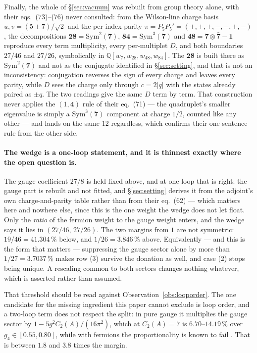 \documentclass[11pt,a4paper]{article}
\newcommand{\rep}[1]{\mathbf{#1}}
\begin{document}
Finally, the whole of \S\ref{sec:vacuum} was rebuilt from group theory alone, with their
eqs.~(73)--(76) never consulted: from the Wilson-line charge basis $u,v=(5\pm7)/\sqrt2$ and the
per-index parity $\pi=P_5P_5'=(+,+,+,-,-,+,-)$, the decompositions $\rep{28}=\mathrm{Sym}^2(\rep7)$,
$\rep{84}=\mathrm{Sym}^3(\rep7)$ and $\rep{48}=\rep7\otimes\rep{\bar7}-\rep1$ reproduce every term
multiplicity, every per-multiplet $D$, and both boundaries $27/46$ and $27/26$, symbolically in
$\mathbb{Q}[w_7,w_{28},w_{48},w_{84}]$. The $\rep{28}$ is built there as $\mathrm{Sym}^2(\rep7)$
and not as the conjugate identified in \S\ref{sec:setting}, and that is not an inconsistency:
conjugation reverses the sign of every charge and leaves every parity, while $D$ sees the charge
only through $c=2|q|$ with the states already paired as $\pm q$. The two readings give the same $D$
term by term. That construction never applies the $(1,\rep4)$ rule of
their eq.~(71) --- the quadruplet's smaller eigenvalue is simply a $\mathrm{Sym}^3(\rep7)$ component
at charge $1/2$, counted like any other --- and lands on the same $12$ regardless, which confirms
their one-sentence rule from the other side.

\paragraph{The wedge is a one-loop statement, and it is thinnest exactly where the open question is.}
The gauge coefficient $27/8$ is held fixed above, and at one loop that is right: the gauge part is
rebuilt and not fitted, and \S\ref{sec:setting} derives it from the adjoint's own charge-and-parity
table rather than from their eq.~(62) --- which matters here and nowhere else, since this is the one
weight the wedge does not let float. Only the \emph{ratio} of the fermion weight to the
gauge weight enters, and the wedge says it lies in $(27/46,\,27/26)$. The two margins from $1$ are
not symmetric: $19/46=41.304\,\%$ below, and $1/26=3.846\,\%$ above. Equivalently --- and this is the
form that matters --- suppressing the gauge sector alone by more than $1/27=3.7037\,\%$ makes row (3)
survive the donation as well, and case (2) stops being unique. A rescaling common to both sectors
changes nothing whatever, which is asserted rather than assumed.

That threshold should be read against Observation~\ref{obs:looporder}. The one candidate for the
missing ingredient this paper cannot exclude is loop order, and a two-loop term does not respect the
split: in pure gauge it multiplies the gauge sector by $1-5g^2C_2(A)/(16\pi^2)$, which at
$C_2(A)=7$ is $6.70$--$14.19\,\%$ over $g_4\in[0.55,0.80]$, while with fermions the proportionality
is known to fail \cite{GuoDu}. That is between $1.8$ and $3.8$ times the margin.
\end{document}
